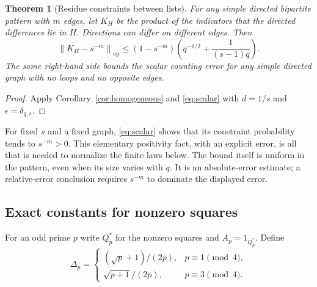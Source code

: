 \documentclass[11pt,a4paper]{article}
\numberwithin{equation}{section}
\newtheorem{theorem}{Theorem}[section]
\theoremstyle{definition}
\theoremstyle{remark}
\newcommand{\op}{\mathrm{op}}
\newcommand{\norm}[1]{\left\lVert #1\right\rVert}
\begin{document}
\begin{theorem}[Residue constraints between lists]
\label{thm:residuelists}
For any simple directed bipartite pattern with $m$ edges, let $K_H$
be the product of the indicators that the directed differences lie in
$H$. Directions can differ on different edges. Then
\begin{equation}
 \boxed{\quad
 \norm{K_H-s^{-m}}_{\op}
 \le(1-s^{-m})\left(q^{-1/2}+\frac1{(s-1)q}\right).
 \quad}
 \label{eq:subgrouplists}
\end{equation}
The same right-hand side bounds the scalar counting error for any
simple directed graph with no loops and no opposite edges.
\end{theorem}
\begin{proof}
Apply Corollary~\ref{cor:homogeneous} and \eqref{eq:scalar} with
$d=1/s$ and $\epsilon=\delta_{q,s}$.
\end{proof}

For fixed $s$ and a fixed graph, \eqref{eq:scalar} shows that its
constraint probability tends to $s^{-m}>0$. This elementary positivity
fact, with an explicit error, is all that is needed to normalize the
finite laws below. The bound itself is uniform in the pattern, even
when its size varies with $q$. It is an absolute-error estimate; a
relative-error conclusion requires $s^{-m}$ to dominate the displayed
error.

\subsection{Exact constants for nonzero squares}

For an odd prime $p$ write $Q_p^*$ for the nonzero squares and
$A_p=1_{Q_p^*}$. Define
\begin{equation}
 \Delta_p=
 \begin{cases}
  (\sqrt p+1)/(2p),&p\equiv1\pmod4,\\
  \sqrt{p+1}/(2p),&p\equiv3\pmod4.
 \end{cases}
 \label{eq:exactdelta}
\end{equation}
\end{document}
